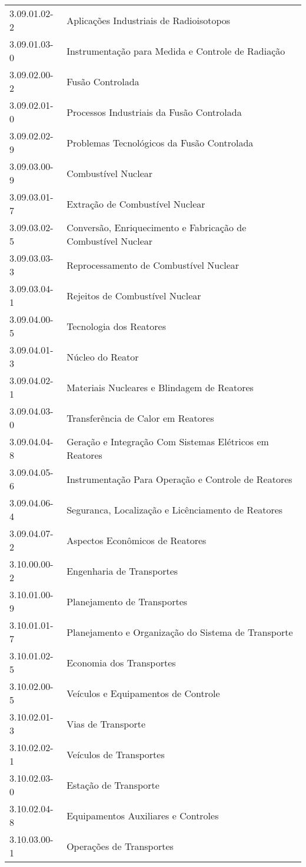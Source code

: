 \begin{longtable}[c]{p{2.15cm}p{13cm}}
3.09.01.02-2 & Aplicações Industriais de Radioisotopos \\
3.09.01.03-0 & Instrumentação para Medida e Controle de Radiação \\
3.09.02.00-2 & Fusão Controlada \\
3.09.02.01-0 & Processos Industriais da Fusão Controlada \\
3.09.02.02-9 & Problemas Tecnológicos da Fusão Controlada \\
3.09.03.00-9 & Combustível Nuclear \\
3.09.03.01-7 & Extração de Combustível Nuclear \\
3.09.03.02-5 & Conversão, Enriquecimento e Fabricação de Combustível Nuclear \\
3.09.03.03-3 & Reprocessamento de Combustível Nuclear \\
3.09.03.04-1 & Rejeitos de Combustível Nuclear \\
3.09.04.00-5 & Tecnologia dos Reatores \\
3.09.04.01-3 & Núcleo do Reator \\
3.09.04.02-1 & Materiais Nucleares e Blindagem de Reatores \\
3.09.04.03-0 & Transferência de Calor em Reatores \\
3.09.04.04-8 & Geração e Integração Com Sistemas Elétricos em Reatores \\
3.09.04.05-6 & Instrumentação Para Operação e Controle de Reatores \\
3.09.04.06-4 & Seguranca, Localização e Licênciamento de Reatores \\
3.09.04.07-2 & Aspectos Econômicos de Reatores \\
3.10.00.00-2 & Engenharia de Transportes \\
3.10.01.00-9 & Planejamento de Transportes \\
3.10.01.01-7 & Planejamento e Organização do Sistema de Transporte \\
3.10.01.02-5 & Economia dos Transportes \\
3.10.02.00-5 & Veículos e Equipamentos de Controle \\
3.10.02.01-3 & Vias de Transporte \\
3.10.02.02-1 & Veículos de Transportes \\
3.10.02.03-0 & Estação de Transporte \\
3.10.02.04-8 & Equipamentos Auxiliares e Controles \\
3.10.03.00-1 & Operações de Transportes \\

\end{longtable}
